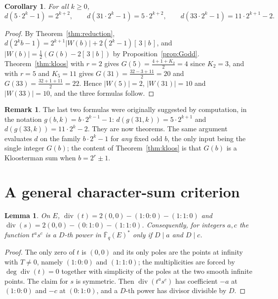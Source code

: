\documentclass[a4paper]{article}
\newtheorem{lemma}[theorem]{Lemma}
\newtheorem{corollary}[theorem]{Corollary}
\theoremstyle{definition}
\newtheorem{remark}[theorem]{Remark}
\newcommand{\F}{\mathbb{F}}
\newcommand{\abs}[1]{\left| #1 \right|}
\begin{document}
	\begin{corollary}\label{cor:families}
		For all $k \geq 0$,
		\begin{equation*}
			d\!\left(5 \cdot 2^k - 1\right) = 2^{k+2},
			\qquad
			d\!\left(31 \cdot 2^k - 1\right) = 5 \cdot 2^{k+2},
			\qquad
			d\!\left(33 \cdot 2^k - 1\right) = 11 \cdot 2^{k+1} - 2 .
		\end{equation*}
	\end{corollary}
	\begin{proof}
		By Theorem~\ref{thm:reduction}, $d(2^kb-1) = 2^{k+1}\abs{W(b)} + 2(2^k-1)[\,3\mid b\,]$, and $\abs{W(b)} = \frac12\left(G(b) - 2[\,3\mid b\,]\right)$ by Proposition~\ref{prop:Godd}.
		Theorem~\ref{thm:kloos} with $r = 2$ gives $G(5) = \frac{4+1+K_2}{2} = 4$ since $K_2 = 3$, and with $r = 5$ and $K_5 = 11$ gives $G(31) = \frac{32-3+11}{2} = 20$ and $G(33) = \frac{32+1+11}{2} = 22$.
		Hence $\abs{W(5)} = 2$, $\abs{W(31)} = 10$ and $\abs{W(33)} = 10$, and the three formulas follow.
	\end{proof}

	\begin{remark}
		The last two formulas were originally suggested by computation, in the notation $g(b,k) = b\cdot 2^{k-1}-1$: $d(g(31,k)) = 5\cdot 2^{k+1}$ and $d(g(33,k)) = 11 \cdot 2^k - 2$.
		They are now theorems.
		The same argument evaluates $d$ on the family $b \cdot 2^k - 1$ for \emph{any} fixed odd $b$, the only input being the single integer $G(b)$; the content of Theorem~\ref{thm:kloos} is that $G(b)$ is a Kloosterman sum when $b = 2^r \pm 1$.
	\end{remark}

	\section{A general character-sum criterion}\label{sec:weil}
	\begin{lemma}\label{lem:divisors}
		On $E$, $\operatorname{div}(t) = 2(0,0) - (1:0:0) - (1:1:0)$ and $\operatorname{div}(s) = 2(0,0) - (0:1:0) - (1:1:0)$.
		Consequently, for integers $a, c$ the function $t^a s^c$ is a $D$-th power in $\overline{\F}_q(E)^*$ only if $D \mid a$ and $D \mid c$.
	\end{lemma}
	\begin{proof}
		The only zero of $t$ is $(0,0)$ and its only poles are the points at infinity with $T \ne 0$, namely $(1:0:0)$ and $(1:1:0)$; the multiplicities are forced by $\deg \operatorname{div}(t) = 0$ together with simplicity of the poles at the two smooth infinite points.
		The claim for $s$ is symmetric.
		Then $\operatorname{div}(t^as^c)$ has coefficient $-a$ at $(1:0:0)$ and $-c$ at $(0:1:0)$, and a $D$-th power has divisor divisible by $D$.
	\end{proof}
\end{document}
